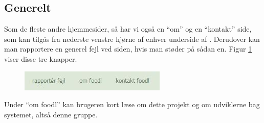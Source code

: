 \subsection{Generelt}
Som de fleste andre hjemmesider, så har vi også en ``om'' og en ``kontakt'' side, som kan tilgås fra nederste venstre hjørne af enhver underside af \Foodl{}. Derudover kan man rapportere en generel fejl ved siden, hvis man støder på sådan en. Figur \ref{fig:foodl-formaliteter} viser disse tre knapper.

\begin{figure}[H]
	\centering
	\includegraphics[scale=0.7]{billeder/foodl/formaliteter.jpg}
	\label{fig:foodl-formaliteter}
\end{figure}

Under ``om foodl'' kan brugeren kort læse om dette projekt og om udviklerne bag systemet, altså denne gruppe.
